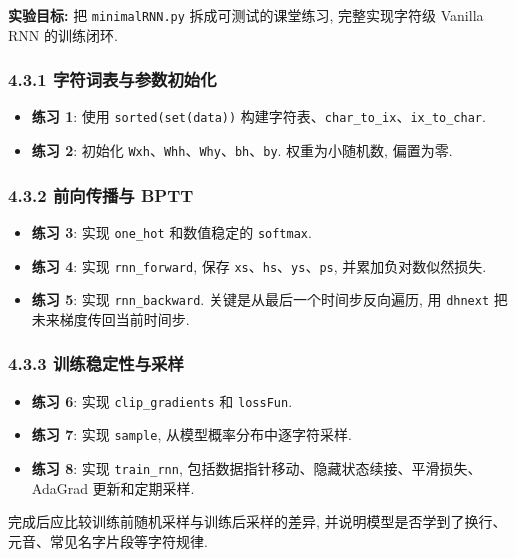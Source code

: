 \documentclass{../../nndlcourse}
\begin{document}
\textbf{实验目标: }把 \texttt{minimalRNN.py} 拆成可测试的课堂练习, 完整实现字符级 Vanilla RNN 的训练闭环.

\subsubsection*{4.3.1 字符词表与参数初始化}

\begin{itemize}
    \item \textbf{练习 1}: 使用 \texttt{sorted(set(data))} 构建字符表、\texttt{char\_to\_ix}、\texttt{ix\_to\_char}.
    \item \textbf{练习 2}: 初始化 \texttt{Wxh}、\texttt{Whh}、\texttt{Why}、\texttt{bh}、\texttt{by}. 权重为小随机数, 偏置为零.
\end{itemize}

\subsubsection*{4.3.2 前向传播与 BPTT}

\begin{itemize}
    \item \textbf{练习 3}: 实现 \texttt{one\_hot} 和数值稳定的 \texttt{softmax}.
    \item \textbf{练习 4}: 实现 \texttt{rnn\_forward}, 保存 \texttt{xs}、\texttt{hs}、\texttt{ys}、\texttt{ps}, 并累加负对数似然损失.
    \item \textbf{练习 5}: 实现 \texttt{rnn\_backward}. 关键是从最后一个时间步反向遍历, 用 \texttt{dhnext} 把未来梯度传回当前时间步.
\end{itemize}

\subsubsection*{4.3.3 训练稳定性与采样}

\begin{itemize}
    \item \textbf{练习 6}: 实现 \texttt{clip\_gradients} 和 \texttt{lossFun}.
    \item \textbf{练习 7}: 实现 \texttt{sample}, 从模型概率分布中逐字符采样.
    \item \textbf{练习 8}: 实现 \texttt{train\_rnn}, 包括数据指针移动、隐藏状态续接、平滑损失、AdaGrad 更新和定期采样.
\end{itemize}

完成后应比较训练前随机采样与训练后采样的差异, 并说明模型是否学到了换行、元音、常见名字片段等字符规律.
\end{document}
